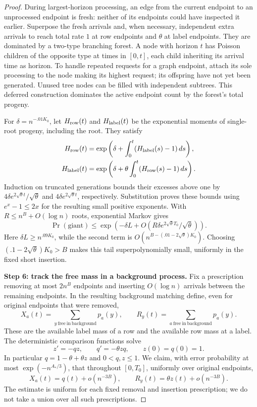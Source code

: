 \begin{proof}
During largest-horizon processing, an edge from the current endpoint to
an unprocessed endpoint is fresh: neither of its endpoints could have
inspected it earlier. Superpose the fresh arrivals and, when necessary,
independent extra arrivals to reach total rate \(1\) at row endpoints
and \(\theta\) at label endpoints. They are dominated by a two-type
branching forest. A node with horizon \(t\) has Poisson children of the
opposite type at times in \([0,t]\), each child inheriting its arrival
time as horizon. To handle repeated requests for a graph endpoint,
attach its sole processing to the node making its highest request;
its offspring have not yet been generated. Unused tree nodes can be
filled with independent subtrees. This deferred construction dominates
the active endpoint count by the forest's total progeny.

For \(\delta=n^{-.01K_0}\), let \(H_{\rm row}(t)\) and
\(H_{\rm label}(t)\) be the exponential moments of single-root progeny,
including the root. They satisfy
\[
 \begin{aligned}
 H_{\rm row}(t)&=\exp\left(\delta+
                    \int_0^t(H_{\rm label}(s)-1)\,ds\right),\\
 H_{\rm label}(t)&=\exp\left(\delta+
                    \theta\int_0^t(H_{\rm row}(s)-1)\,ds\right).
 \end{aligned}
\]
Induction on truncated generations bounds their excesses above one by
\(4\delta e^{2\sqrt\theta t}/\sqrt\theta\) and
\(4\delta e^{2\sqrt\theta t}\), respectively. Substitution proves
these bounds using \(e^x-1\le2x\) for the resulting small positive
exponents. With \(R\le n^B+O(\log n)\) roots, exponential Markov gives
\[
 \Pr(\text{giant})\le
 \exp\left(-\delta L+
      O(R\delta e^{2\sqrt\theta T_0}/\sqrt\theta)\right).
\]
Here \(\delta L\ge n^{.09K_0}\), while the second term is
\(O(n^{B-(.01-2\sqrt\theta)K_0})\). Choosing
\((.1-2\sqrt\theta)K_0>B\) makes this tail superpolynomially small,
uniformly in the fixed short insertion.

\noindent\textbf{Step 6: track the free mass in a background process.}\quad
Fix a prescription removing at most \(2n^B\) endpoints and inserting
\(O(\log n)\) arrivals between the remaining endpoints. In the resulting
background matching define, even for original endpoints that were removed,
\[
 X_a(t)=\sum_{y\ \mathrm{free\ in\ background}}p_a(y),\qquad
 R_y(t)=\sum_{a\ \mathrm{free\ in\ background}}p_a(y).
\]
These are the available label mass of a row and the available row mass
at a label. The deterministic comparison functions solve
\[
 z'=-qz,\qquad q'=-\theta zq,\qquad z(0)=q(0)=1.
\]
In particular \(q=1-\theta+\theta z\) and \(0<q,z\le1\). We claim,
with error probability at most \(\exp(-n^{A_*/3})\), that throughout
\([0,T_0]\), uniformly over original endpoints,
\[
 X_a(t)=q(t)+o(n^{-3B}),\qquad
 R_y(t)=\theta z(t)+o(n^{-3B}).
\]
The estimate is uniform for each fixed removal and insertion prescription;
we do not take a union over all such prescriptions.


\end{proof}
